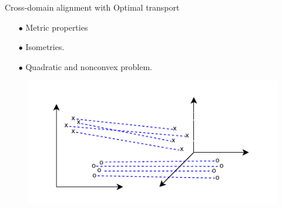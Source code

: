 \documentclass{beamer}
\begin{document}
\begin{frame}{Cross-domain alignment with Optimal transport}
\vspace{-0.3cm}
\begin{minipage}[t]{0.5\linewidth}
\begin{itemize}
  \item[$\bullet$] Metric properties
  \item[$\bullet$] Isometries.
  \item[$\bullet$] Quadratic and nonconvex problem.
\end{itemize}
\end{minipage}%
\hfill%
\hspace{-6cm}
\begin{minipage}[t]{0.55\linewidth}
\begin{figure}
  \centering
  \includegraphics[width=1.2\linewidth, keepaspectratio=true]{OT_new/gw.pdf}
\end{figure}
\end{minipage}

\end{frame}
\end{document}

